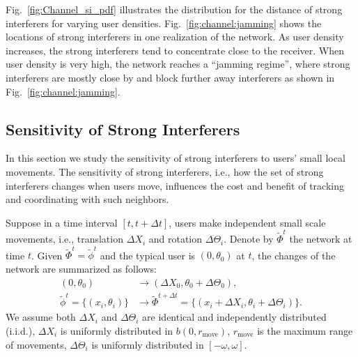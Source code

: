 \documentclass[10pt, conference, letterpaper]{IEEEtran}
\begin{document}
Fig.~\ref{fig:Channel_si_pdf} illustrates the distribution for the distance of strong interferers for varying user densities. 
Fig.~\ref{fig:channel:jamming} shows the locations of strong interferers in one realization of the network.
As user density increases, the strong interferers tend to concentrate close to the receiver. When user density is very high, the network reaches a ``jamming regime'', where strong interferers are mostly close by and block further away interferers as shown in Fig.~\ref{fig:channel:jamming}.



\subsection{Sensitivity of Strong Interferers}\label{section:channel:sensitivity}
In this section we study the sensitivity of strong interferers to users' small local movements.
The sensitivity of strong interferers, i.e., how the set of strong interferers changes when users move, influences the cost and benefit of tracking and coordinating with such neighbors.

Suppose in a time interval $[t, t+ \Delta t]$, users make independent small scale movements, i.e., translation $\Delta X_i$ and rotation $\Delta \Theta_i$. 
Denote by $\tilde{\Phi}^t$ the network at time $t$. Given $\tilde{\Phi}^t = \tilde{\phi}^t$ and the typical user is $(0, \theta_0)$ at $t$, the changes of the network are summarized as follows:
\begin{equation*}
\begin{split}
(0,\theta_0)&\rightarrow(\Delta X_0, \theta_0 + \Delta\Theta_0), \\
\tilde{\phi}^{t}=\{(x_i, \theta_i)\}&\rightarrow\tilde{\Phi}^{t+\Delta t}=\{(x_i+\Delta X_i, \theta_i + \Delta\Theta_i)\}.
\end{split}
\end{equation*}
We assume both $\Delta X_i$ and $\Delta\Theta_i$ are identical and independently distributed (i.i.d.), $\Delta X_i$ is uniformly distributed in $b(0,r_{\mathrm{move}})$, $r_{\mathrm{move}}$ is the maximum range of movements, $\Delta \Theta_i$ is uniformly distributed in $[-\omega, \omega]$.
\end{document}

